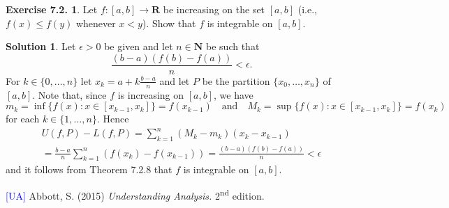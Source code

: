 \documentclass[12pt]{article}
\theoremstyle{definition}
\theoremstyle{exercise}
\newtheorem{exercise}{Exercise 7.2.}
\theoremstyle{solution}
\newtheorem*{solution}{Solution}
\newcommand{\ts}{\textsuperscript}
\newcommand{\quand}{\quad \text{and} \quad}
\newcommand{\N}{\mathbf{N}}
\newcommand{\R}{\mathbf{R}}
\begin{document}
\begin{exercise}
\label{ex:7}
    Let \( f : [a, b] \to \R \) be increasing on the set \( [a, b] \) (i.e., \( f(x) \leq f(y) \) whenever \( x < y \)). Show that \( f \) is integrable on \( [a, b] \).
\end{exercise}

\begin{solution}
    Let \( \epsilon > 0 \) be given and let \( n \in \N \) be such that
    \[
        \frac{(b - a)(f(b) - f(a))}{n} < \epsilon.
    \]
    For \( k \in \{ 0, \ldots, n \} \) let \( x_k = a + k \tfrac{b - a}{n} \) and let \( P \) be the partition \( \{ x_0, \ldots, x_n \} \) of \( [a, b] \). Note that, since \( f \) is increasing on \( [a, b] \), we have
    \[
        m_k = \inf \{ f(x) : x \in [x_{k-1}, x_k] \} = f(x_{k-1}) \quand M_k = \sup \{ f(x) : x \in [x_{k-1}, x_k] \} = f(x_k)
    \]
    for each \( k \in \{ 1, \ldots, n \} \). Hence
    \begin{multline*}
        U(f, P) - L(f, P) = \sum_{k=1}^n (M_k - m_k) (x_k - x_{k-1}) \\
        = \frac{b - a}{n} \sum_{k=1}^n (f(x_k) - f(x_{k-1})) = \frac{(b - a)(f(b) - f(a))}{n} < \epsilon
    \end{multline*}
    and it follows from Theorem 7.2.8 that \( f \) is integrable on \( [a, b] \).
\end{solution}

\noindent \hrulefill

\noindent \hypertarget{ua}{\textcolor{blue}{[UA]} Abbott, S. (2015) \textit{Understanding Analysis.} 2\ts{nd} edition.}
\end{document}
